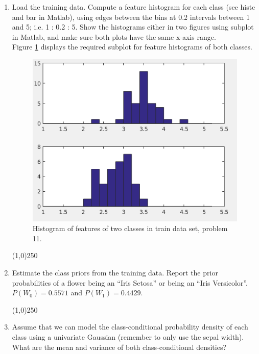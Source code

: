 \documentclass[12pt]{article}
\begin{document}
\begin{enumerate}
\item Load the training data. Compute a feature histogram for each class (see histc and bar in Matlab), using edges between the bins at 0.2 intervals between 1 and 5; i.e. 1 : 0.2 : 5. Show the histograms either in two figures using subplot in Matlab, and make sure both plots have the same x-axis range.\\

Figure \ref{fig:11-1} displays the required subplot for feature histograms of both classes.
\begin{figure}[h]
\centering
\includegraphics[scale=0.5]{Imgs/11-1.png}
\caption{Histogram of features of two classes in train data set, problem 11.}
\label{fig:11-1}
\end{figure}

\begin{center}
\line(1,0){250}
\end{center}

\item Estimate the class priors from the training data. Report the prior probabilities of a flower being an “Iris Setosa” or being an “Iris Versicolor”.\\

$P(W_0) = 0.5571$ and $P(W_1) = 0.4429$.

\begin{center}
\line(1,0){250}
\end{center}

\item Assume that we can model the class-conditional probability density of each class using a univariate Gaussian (remember to only use the sepal width). What are the mean and variance of both class-conditional densities?\\


\end{enumerate}
\end{document}
